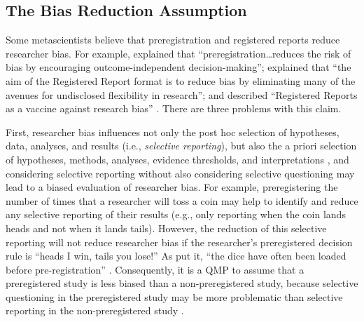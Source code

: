 \documentclass[authordate, meta, issue]{jote-new-article}
\begin{document}
\newpage
\subsection{The Bias Reduction Assumption}



Some metascientists believe that preregistration and registered reports reduce researcher bias. For example, \textcite[p. 15]{Hardwicke2023} explained that “preregistration…reduces the risk of bias by encouraging outcome-independent decision-making”; \textcite[p. 166]{Vazire2022} explained that “the aim of the Registered Report format is to reduce bias by eliminating many of the avenues for undisclosed flexibility in research”; and \textcite{Chambers2018} described “Registered Reports as a vaccine against research bias” \parencites[see also][p. 32]{Chambers2022}[p. 2]{Scheel2021}[for commentary, see][]{Field2021}. There are three problems with this claim.



First, researcher bias influences not only the post hoc selection of hypotheses, data, analyses, and results (i.e., \emph{selective reporting}), but also the a priori selection of hypotheses, methods, analyses, evidence thresholds, and interpretations \parencites[i.e., \emph{selective questioning};][]{Rubin2022a}, and considering selective reporting without also considering selective questioning may lead to a biased evaluation of researcher bias. For example, preregistering the number of times that a researcher will toss a coin may help to identify and reduce any selective reporting of their results (e.g., only reporting when the coin lands heads and not when it lands tails). However, the reduction of this selective reporting will not reduce researcher bias if the researcher’s preregistered decision rule is “heads I win, tails you lose!” As \textcite{Clark2022} put it, “the dice have often been loaded before pre-registration” \parencites[p. 13, see also][]{Dellsén2020}{Jamieson2023}. Consequently, it is a QMP to assume that a preregistered study is less biased than a non-preregistered study, because selective questioning in the preregistered study may be more problematic than selective reporting in the non-preregistered study \parencites[for similar concerns, see][p. 16]{Devezer2021}[p. 698]{Freiling2021}{Jamieson2023}{McDermott2022}{Oberauer2019}[p. 167]{Pham2021}{Rubin2022a}[p. 95]{Szollosi2020}[p. 212]{Wiggins2019}.
\end{document}
